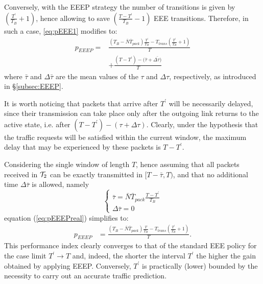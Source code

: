 \documentclass[journal,10pt,twoside,final]{IEEEtran}
\begin{document}
Conversely, with the EEEP strategy the number of transitions is given by $\left(\frac{T^\prime}{T_B}+1\right)$, hence  allowing to save $\left(\frac{T - T^\prime}{T_B} - 1\right)$ EEE transitions. Therefore, in such a case, \eqref{eq:pEEE1} modifies to:
\begin{align}
p_{EEEP} = & \frac{\left(T_B - \bar{N} \bar{T}_{pack}\right)\frac{T^\prime}{T_B} - T_{trans} \left(\frac{T^\prime}{T_B} + 1\right)}{T}
\nonumber\\
 & + \frac {(T  - T^\prime) - (\bar {\tau} + \bar {\Delta \tau)}}{T}
\label{eq:pEEEPreal}
\end{align}
where $\bar{\tau}$ and $\Delta \bar{\tau}$ are the mean values of the $\tau$ and $\Delta \tau$, respectively, as introduced in \S\ref{subsec:EEEP}.

It is worth noticing that packets that arrive after $T^\prime$ will be necessarily delayed, since their transmission can take place only after the outgoing link returns to the active state, i.e. after $\left(T  - T^\prime\right) - \left(\tau + \Delta \tau\right)$. Clearly, under the hypothesis that the traffic requests will be satisfied within the current window, the maximum delay that may be experienced by these packets is $T-T^\prime$.



Considering the single window of length $T$, hence assuming that all packets received in ${\cal T}_2$ can be exactly transmitted in $[T-\bar{\tau},T)$, and that no additional time $\Delta\bar{\tau}$ is allowed, namely
\begin{equation}
\left\{
	\begin{array}{l}
		\bar{\tau} = \bar{N} \bar{T}_{pack} \frac{T - T^\prime}{T_B}\\
		\Delta \bar{\tau} = 0
	\end{array}
\right .
\end{equation}
equation (\ref{eq:pEEEPreal}) simplifies to:
\begin{align}
\label{eq:pEEEP}
p_{EEEP} &= \frac{\left(T_B - \bar{N} \bar{T}_{pack}\right)\frac{T}{T_B} - T_{trans} \left(\frac{T^\prime}{T_B} + 1\right)}{T}.
\end{align}
This performance index clearly converges to that of the standard EEE policy for the case limit $T^\prime\rightarrow T$ and, indeed, the shorter the interval $T^\prime$ the higher the gain obtained by applying EEEP. Conversely, $T^\prime$ is practically (lower) bounded by the necessity to carry out an accurate traffic prediction.
\end{document}
